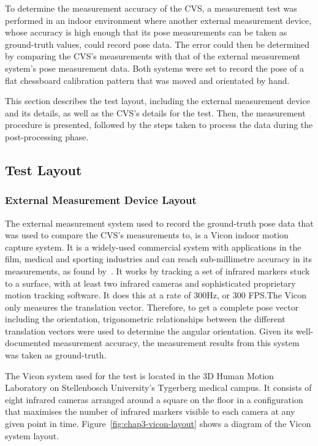 To determine the measurement accuracy of the CVS, a measurement test was performed in an indoor environment where another external measurement device, whose accuracy is high enough that its pose measurements can be taken as ground-truth values, could record pose data. The error could then be determined by comparing the CVS's measurements with that of the external measurement system's pose measurement data. Both systems were set to record the pose of a flat chessboard calibration pattern that was moved and orientated by hand.

This section describes the test layout, including the external measurement device and its details, as well as the CVS's details for the test. Then, the measurement procedure is presented, followed by the steps taken to process the data during the post-processing phase. 

\subsection{Test Layout}
\label{sec:vicon-test-setup}

\subsubsection{External Measurement Device Layout}

The external measurement system used to record the ground-truth pose data that was used to compare the CVS's measurements to, is a Vicon indoor motion capture system. It is a widely-used commercial system with applications in the film, medical and sporting industries and can reach sub-millimetre accuracy in its measurements, as found by~\cite{windolf2008systematic}. It works by tracking a set of infrared markers stuck to a surface, with at least two infrared cameras and sophisticated proprietary motion tracking software. It does this at a rate of 300Hz, or 300 FPS.\@ The Vicon only measures the translation vector. Therefore, to get a complete pose vector including the orientation, trigonometric relationships between the different translation vectors were used to determine the angular orientation. Given its well-documented measurement accuracy, the measurement results from this system was taken as ground-truth.

The Vicon system used for the test is located in the 3D Human Motion Laboratory on Stellenbosch University's Tygerberg medical campus. It consists of eight infrared cameras arranged around a square on the floor in a configuration that maximises the number of infrared markers visible to each camera at any given point in time. Figure~\ref{fig:chap3-vicon-layout} shows a diagram of the Vicon system layout. 
 
